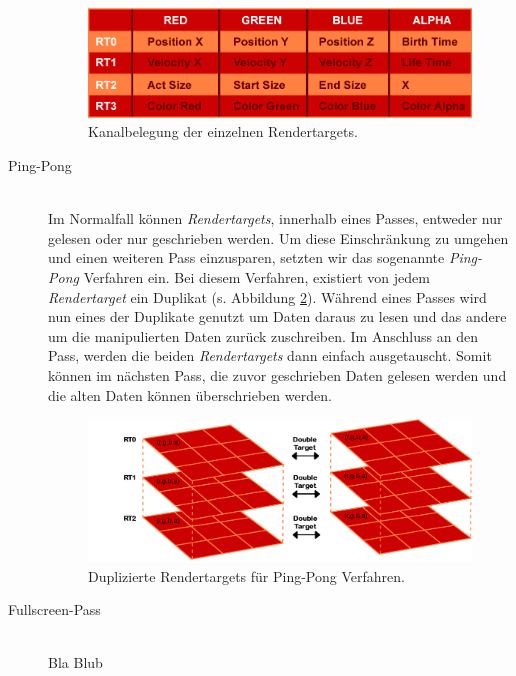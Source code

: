 \begin{Spacing}{\mylinespace}
\begin{description}
\begin{figure}[h!]
	\centering
	\vspace*{55px}
	\includegraphics[width=410px]{graphics/RendertargetsChannels.png}
	\caption{Kanalbelegung der einzelnen Rendertargets.}
	\label{fig:RTCahnnels}
\end{figure}	
	
	\item[Ping-Pong] \hfill \\
	Im Normalfall können \textit{Rendertargets}, innerhalb eines Passes, entweder nur gelesen oder nur geschrieben werden. Um diese Einschränkung zu umgehen und einen weiteren Pass einzusparen, setzten wir das sogenannte \textit{Ping-Pong} Verfahren ein. Bei diesem Verfahren, existiert von jedem \textit{Rendertarget} ein Duplikat (s. Abbildung \ref{fig:DoubleTarget}). Während eines Passes wird nun eines der Duplikate genutzt um Daten daraus zu lesen und das andere um die manipulierten Daten zurück zuschreiben. Im Anschluss an den Pass, werden die beiden \textit{Rendertargets} dann einfach ausgetauscht. Somit können im nächsten Pass, die zuvor geschrieben Daten gelesen werden und die alten Daten können überschrieben werden.
	
\begin{figure}[h!]
	\centering
	\vspace*{30px}
	\includegraphics[width=410px]{graphics/DoubleTargets2.png}
	\caption{Duplizierte Rendertargets für Ping-Pong Verfahren.}
	\label{fig:DoubleTarget}
\end{figure}

	\item[Fullscreen-Pass] \hfill \\
Bla Blub
\end{description}


\end{Spacing}
